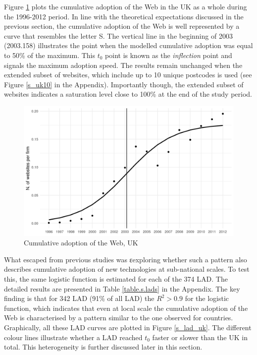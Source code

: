 \documentclass[
  authoryear,
  preprint,
  3p]{elsarticle}
\begin{document}
Figure \ref{s_uk} plots the cumulative adoption of the Web in the UK as
a whole during the 1996-2012 period. In line with the theoretical
expectations discussed in the previous section, the cumulative adoption
of the Web is well represented by a curve that resembles the letter S.
The vertical line in the beginning of 2003 (2003.158) illustrates the
point when the modelled cumulative adoption was equal to 50\% of the
maximum. This \(t_0\) point is known as the \emph{inflection} point and
signals the maximum adoption speed. The results remain unchanged when
the extended subset of websites, which include up to 10 unique postcodes
is used (see Figure \ref{s_uk10} in the Appendix). Importantly though,
the extended subset of websites indicates a saturation level close to
100\% at the end of the study period.

\begin{figure}[H]

{\centering \includegraphics[width=1\textwidth,height=\textheight]{../../outputs/s/s_uk_per_firm.png}

}

\caption{\label{s_uk}Cumulative adoption of the Web, UK}

\end{figure}%

What escaped from previous studies was εexploring whether such a pattern
also describes cumulative adoption of new technologies at sub-national
scales. To test this, the same logistic function is estimated for each
of the 374 LAD. The detailed results are presented in Table
\ref{table.s.lads} in the Appendix. The key finding is that for 342 LAD
(91\% of all LAD) the \(R^2 > 0.9\) for the logistic function, which
indicates that even at local scale the cumulative adoption of the Web is
characterised by a pattern similar to the one observed for countries.
Graphically, all these LAD curves are plotted in Figure \ref{s_lad_uk}.
The different colour lines illustrate whether a LAD reached \(t_0\)
faster or slower than the UK in total. This heterogeneity is further
discussed later in this section.
\end{document}
